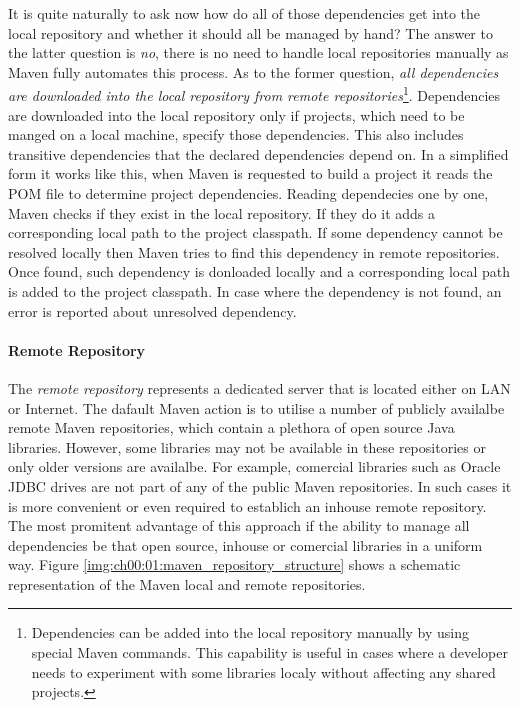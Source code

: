   It is quite naturally to ask now how do all of those dependencies get into the local repository and whether it should all be managed by hand?
  The answer to the latter question is \emph{no}, there is no need to handle local repositories manually as Maven fully automates this process.
  As to the former question, \emph{all dependencies are downloaded into the local repository from remote repositories}\footnote{
    Dependencies can be added into the local repository manually by using special Maven commands. 
    This capability is useful in cases where a developer needs to experiment with some libraries localy without affecting any shared projects.
  }.
  Dependencies are downloaded into the local repository only if projects, which need to be manged on a local machine, specify those dependencies.
  This also includes transitive dependencies that the declared dependencies depend on.
  In a simplified form it works like this, when Maven is requested to build a project it reads the POM file to determine project dependencies.
  Reading dependecies one by one, Maven checks if they exist in the local repository.
  If they do it adds a corresponding local path to the project classpath.
  If some dependency cannot be resolved locally then Maven tries to find this dependency in remote repositories.
  Once found, such dependency is donloaded locally and a corresponding local path is added to the project classpath.
  In case where the dependency is not found, an error is reported about unresolved dependency.

  \paragraph*{Remote Repository}
  
  The \emph{remote repository} represents a dedicated server that is located either on LAN or Internet.
  The dafault Maven action is to utilise a number of publicly availalbe remote Maven repositories, which contain a plethora of open source Java libraries.
  However, some libraries may not be available in these repositories or only older versions are availalbe.
  For example, comercial libraries such as Oracle JDBC drives are not part of any of the public Maven repositories.
  In such cases it is more convenient or even required to establich an inhouse remote repository.
  The most promitent advantage of this approach if the ability to manage all dependencies be that open source, inhouse or comercial libraries in a uniform way.
  Figure \ref{img:ch00:01:maven_repository_structure} shows a schematic representation of the Maven local and remote repositories.

